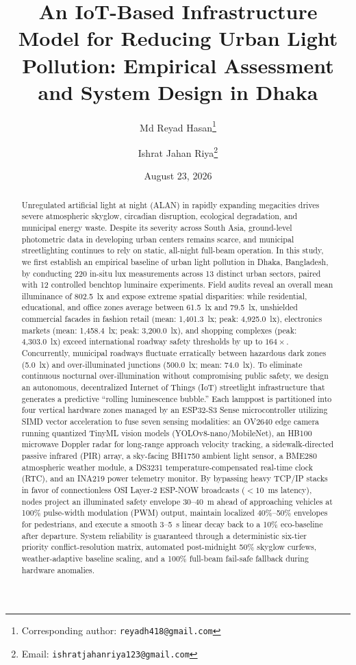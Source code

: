 \documentclass[11pt,a4paper]{article}
\title{\textbf{An IoT-Based Infrastructure Model for Reducing Urban Light Pollution: Empirical Assessment and System Design in Dhaka}}
\author[1]{Md Reyad Hasan\thanks{Corresponding author: \texttt{reyadh418@gmail.com}}}
\author[2]{Ishrat Jahan Riya\thanks{Email: \texttt{ishratjahanriya123@gmail.com}}}
\affil[1]{Government Science College, Dhaka, Bangladesh}
\affil[2]{Mavenwood International School, Dhaka, Bangladesh}
\date{August 23, 2026}
\begin{document}
\maketitle

\begin{abstract}
\noindent Unregulated artificial light at night (ALAN) in rapidly expanding megacities drives severe atmospheric skyglow, circadian disruption, ecological degradation, and municipal energy waste. Despite its severity across South Asia, ground-level photometric data in developing urban centers remains scarce, and municipal streetlighting continues to rely on static, all-night full-beam operation. In this study, we first establish an empirical baseline of urban light pollution in Dhaka, Bangladesh, by conducting 220 in-situ lux measurements across 13 distinct urban sectors, paired with 12 controlled benchtop luminaire experiments. Field audits reveal an overall mean illuminance of 802.5~lx and expose extreme spatial disparities: while residential, educational, and office zones average between 61.5~lx and 79.5~lx, unshielded commercial facades in fashion retail (mean: 1,401.3~lx; peak: 4,925.0~lx), electronics markets (mean: 1,458.4~lx; peak: 3,200.0~lx), and shopping complexes (peak: 4,303.0~lx) exceed international roadway safety thresholds by up to \(164\times\). Concurrently, municipal roadways fluctuate erratically between hazardous dark zones (5.0~lx) and over-illuminated junctions (500.0~lx; mean: 74.0~lx). To eliminate continuous nocturnal over-illumination without compromising public safety, we design an autonomous, decentralized Internet of Things (IoT) streetlight infrastructure that generates a predictive ``rolling luminescence bubble.'' Each lamppost is partitioned into four vertical hardware zones managed by an ESP32-S3 Sense microcontroller utilizing SIMD vector acceleration to fuse seven sensing modalities: an OV2640 edge camera running quantized TinyML vision models (YOLOv8-nano/MobileNet), an HB100 microwave Doppler radar for long-range approach velocity tracking, a sidewalk-directed passive infrared (PIR) array, a sky-facing BH1750 ambient light sensor, a BME280 atmospheric weather module, a DS3231 temperature-compensated real-time clock (RTC), and an INA219 power telemetry monitor. By bypassing heavy TCP/IP stacks in favor of connectionless OSI Layer-2 ESP-NOW broadcasts (\(<10\)~ms latency), nodes project an illuminated safety envelope 30--40~m ahead of approaching vehicles at 100\% pulse-width modulation (PWM) output, maintain localized 40\%--50\% envelopes for pedestrians, and execute a smooth 3--5~s linear decay back to a 10\% eco-baseline after departure. System reliability is guaranteed through a deterministic six-tier priority conflict-resolution matrix, automated post-midnight 50\% skyglow curfews, weather-adaptive baseline scaling, and a 100\% full-beam fail-safe fallback during hardware anomalies.
\end{abstract}
\end{document}
